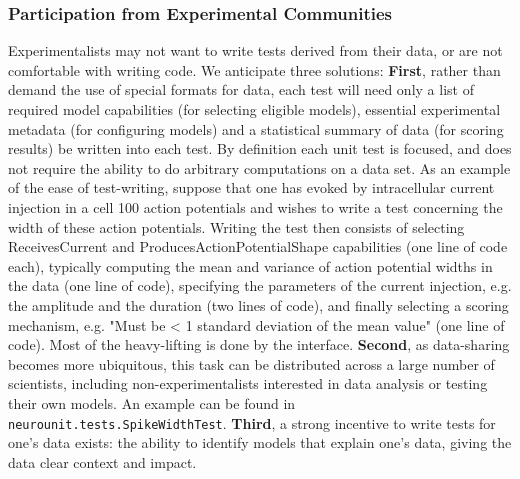 \documentclass[11pt,letterpaper]{article}
\begin{document}
\subsubsection{Participation from Experimental Communities}
Experimentalists may not want to write tests derived from their data, or are not comfortable with writing code.  We anticipate three solutions: \textbf{First}, rather than demand the use of special formats for data, each test will need only a list of required model capabilities (for selecting eligible models), essential experimental metadata (for configuring models) and a statistical summary of data (for scoring results) be written into each test.  By definition each unit test is focused, and does not require the ability to do arbitrary computations on a data set.  As an example of the ease of test-writing, suppose that one has evoked by intracellular current injection in a cell 100 action potentials and wishes to write a test concerning the width of these action potentials.  Writing the test then consists of selecting ReceivesCurrent and ProducesActionPotentialShape capabilities (one line of code each), typically computing the mean and variance of action potential widths in the data (one line of code), specifying the parameters of the current injection, e.g. the amplitude and the duration (two lines of code), and finally selecting a scoring mechanism, e.g. "Must be < 1 standard deviation of the mean value" (one line of code).  Most of the heavy-lifting is done by the interface.  \textbf{Second}, as data-sharing becomes more ubiquitous, this task can be distributed across a large number of scientists, including non-experimentalists interested in data analysis or testing their own models.  An example can be found in \verb|neurounit.tests.SpikeWidthTest|.  \textbf{Third}, a strong incentive to write tests for one's data exists: the ability to identify models that explain one's data, giving the data clear context and impact. 
\end{document}
